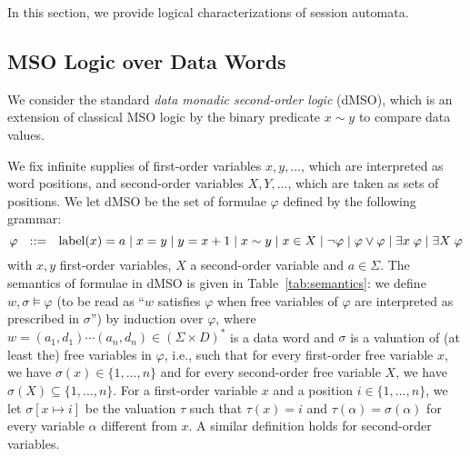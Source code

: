 \documentclass{LMCS}
\newcommand{\set}[1]{\{1,\ldots,#1\}}
\newcommand{\mylabel}{\textup{label}}
\renewcommand{\phi}{\varphi}
\begin{document}
\label{sec:logic}

In this section, we provide logical characterizations of session automata.

\subsection{MSO Logic over Data Words}

We consider the standard \emph{data monadic second-order logic} (dMSO), which is an extension of
classical MSO logic by the binary predicate $x \sim y$ to compare data
values.  

We fix infinite supplies of first-order variables $x,y, \ldots$, which
are interpreted as word positions, and second-order variables $X,Y,
\ldots$, which are taken as sets of positions.
We let dMSO be the set of formulae $\phi$ defined by the following
grammar:
\[\phi ~~::=~~ \mylabel(x)=a \mid x=y \mid y=x+1\mid x\sim
y\mid x\in X\mid \neg \phi \mid \phi\lor\phi \mid \exists x \; \phi\mid \exists
X\; \phi\] with $x,y$ first-order variables, $X$ a second-order variable
and $a\in\Sigma$. The semantics of formulae in dMSO is given in
Table~\ref{tab:semantics}: we define $w,\sigma\models \phi$ (to be
read as ``$w$ satisfies $\phi$ when free variables of $\phi$ are
interpreted as prescribed in $\sigma$'') by induction over $\phi$,
where $w=(a_1,d_1)\cdots (a_n,d_n) \in (\Sigma \times D)^\ast$ is a
data word and $\sigma$ is a valuation of (at least the) free variables in $\phi$,
i.e., such that for every first-order free variable $x$, we have
$\sigma(x)\in\set{n}$ and for every second-order free variable $X$, we
have $\sigma(X)\subseteq \set{n}$. For a first-order variable $x$ and
a position $i\in\set{n}$, we let $\sigma[x\mapsto i]$ be the valuation
$\tau$ such that $\tau(x)=i$ and $\tau(\alpha)=\sigma(\alpha)$ for
every variable $\alpha$ different from $x$. A similar definition holds for
second-order variables.
\end{document}
